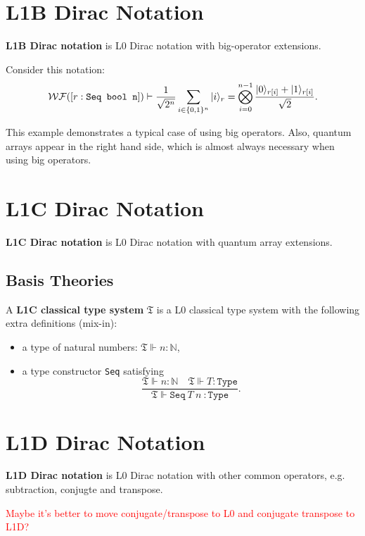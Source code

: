 \section{L1B Dirac Notation}
\textbf{L1B Dirac notation} is L0 Dirac notation with big-operator extensions.

Consider this notation:
$$
\mathcal{WF}([r : \texttt{Seq bool n}]) \vdash \frac{1}{\sqrt{2^n}}\sum_{i \in \{0, 1\}^n} |i\rangle_r = \bigotimes_{i=0}^{n-1} \frac{|0\rangle_{r[i]} + |1\rangle_{r[i]}}{\sqrt{2}}.
$$

This example demonstrates a typical case of using big operators. Also, quantum arrays appear in the right hand side, which is almost always necessary when using big operators.



\section{L1C Dirac Notation}
\textbf{L1C Dirac notation} is L0 Dirac notation with quantum array extensions.

\subsection{Basis Theories}

\begin{definition}
  A \textbf{L1C classical type system} $\mathfrak{T}$ is a L0 classical type system with the following extra definitions (mix-in):
  \begin{itemize}
    \item a type of natural numbers: $\mathfrak{T} \Vdash n : \mathbb{N}$,
    \item a type constructor \texttt{Seq} satisfying
    $$
    \frac{\mathfrak{T} \Vdash n : \mathbb{N}\quad \mathfrak{T} \Vdash T : \texttt{Type}}
    {\mathfrak{T} \Vdash \texttt{Seq}\ T\ n\ : \texttt{Type}}.
    $$
  \end{itemize}

\end{definition}


\section{L1D Dirac Notation}
\textbf{L1D Dirac notation} is L0 Dirac notation with other common operators, e.g. subtraction, conjugte and transpose.

\textcolor{red}{Maybe it's better to move conjugate/transpose to L0 and conjugate transpose to L1D?}


